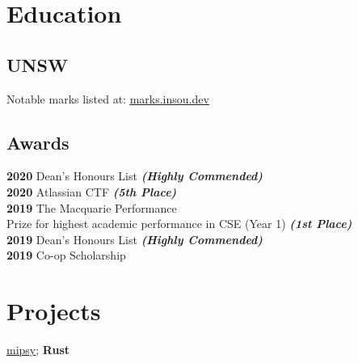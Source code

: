 \documentclass[a4paper]{deedy-resume}
\begin{document}
\begin{minipage}[t]{0.35\textwidth}


\section{Education} 

\subsection{UNSW}

Notable marks listed at:
\href{https://marks.insou.dev}{\underline{marks.insou.dev}}

\sectionspace

\subsection{Awards}

\textbf{2020}
Dean's Honours List
{\footnotesize \textit{\textbf{(Highly Commended) }}} \\

\textbf{2020}
Atlassian CTF
{\footnotesize \textit{\textbf{(5th Place) }}} \\

\textbf{2019}
The Macquarie Performance \\
Prize for highest academic performance
in CSE (Year 1)
{\footnotesize \textit{\textbf{(1st Place) }}} \\

\textbf{2019}
Dean's Honours List
{\footnotesize \textit{\textbf{(Highly Commended) }}} \\

\textbf{2019}
Co-op Scholarship \\

\sectionspace


\section{Projects}

\href{https://github.com/insou22/mipsy}
	{\underline{mipsy}}; \textbf{ Rust}


\end{minipage}
\end{document}
